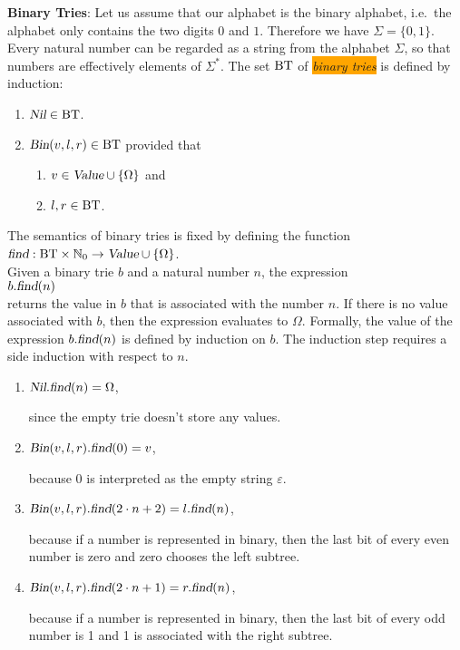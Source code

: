 \exercise
\textbf{Binary Tries}:  Let us assume that our alphabet is the binary alphabet, i.e.~the alphabet
only contains the two digits $0$ and $1$.  Therefore we have $\Sigma = \{0,1\}$.  Every natural
number can be regarded as a string from the alphabet $\Sigma$, so that numbers are effectively
elements of $\Sigma^*$.  The set $\mathrm{BT}$ of \colorbox{orange}{\emph{binary tries}} is defined by induction:
\begin{enumerate}
\item $\textsl{Nil} \in \mathrm{BT}$.
\item $\textsl{Bin}(v,l,r) \in \mathrm{BT}$ provided that
      \begin{enumerate}
      \item $v \in \textsl{Value} \cup \{\Omega\}$ \quad and
      \item $l,r \in \mathrm{BT}$.
      \end{enumerate}
\end{enumerate}
The semantics of binary tries is fixed by defining the function
\\[0.2cm]
\hspace*{1.3cm}
$\textsl{find}: \mathrm{BT} \times \mathbb{N}_0 \rightarrow \textsl{Value} \cup \{ \Omega \}$.
\\[0.2cm]
Given a binary trie $b$ and a natural number $n$, the expression
\\[0.2cm]
\hspace*{1.3cm}
$b.\textsl{find}(n)$ 
\\[0.2cm]
returns the value in $b$ that is associated with the number $n$.  If there is no value associated
with $b$, then the expression evaluates to $\Omega$.  Formally, the value of the expression
 $b.\textsl{find}(n)$ is defined by induction on $b$.  The induction step requires a side induction
 with respect to $n$.
\begin{enumerate}
\item $\textsl{Nil}.\textsl{find}(n) = \Omega$,

      since the empty trie doesn't store any values.
\item $\textsl{Bin}(v,l,r).\textsl{find}(0) = v$,

      because $0$ is interpreted as the empty string $\varepsilon$.
\item $\textsl{Bin}(v,l,r).\textsl{find}(2\cdot n + 2) = l.\textsl{find}(n)$,

      because if a number is represented in binary, then the last bit of every even number is zero
      and zero chooses the left subtree.
\item $\textsl{Bin}(v,l,r).\textsl{find}(2 \cdot n + 1) = r.\textsl{find}(n)$,

      because if a number is represented in binary, then the last bit of every odd number is 1 and 
      1 is associated with the right subtree.
\end{enumerate}
